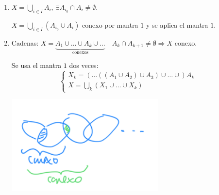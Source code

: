 \begin{coro}[Variantes]
\begin{enumerate}
    \item $X = \bigcup_{i \in  I} A_i,\ \exists A_{i_0} \cap A_i \neq \emptyset$.
    \begin{demo}
        $X = \bigcup_{i \in  I}\left( A_{i_0} \cup A_i \right)$ conexo por mantra $1$ y se aplica el mantra $1$.
    \end{demo}
    \item Cadenas: $X = \underbrace{A_1 \cup \ldots \cup A_k \cup \ldots}_{\text{conexos}}\quad A_k \cap A_{k + 1} \neq \emptyset \Rightarrow X$ conexo.
    \begin{demo}
        Se usa el mantra $1$ dos veces:
        \[
        \begin{cases}
            X_k = \left( \ldots \left( \left( A_1 \cup A_2 \right) \cup A_3 \right) \cup \ldots \cup \right) A_k\\
            X = \bigcup_{k} \left( X_1 \cup \ldots \cup X_k \right) 
        \end{cases} 
        \]
        \begin{center}
            \includegraphics[scale=0.3]{images/dem_var_mantra_1_conx} 
        \end{center}
    \end{demo}
\end{enumerate} 
\end{coro}

